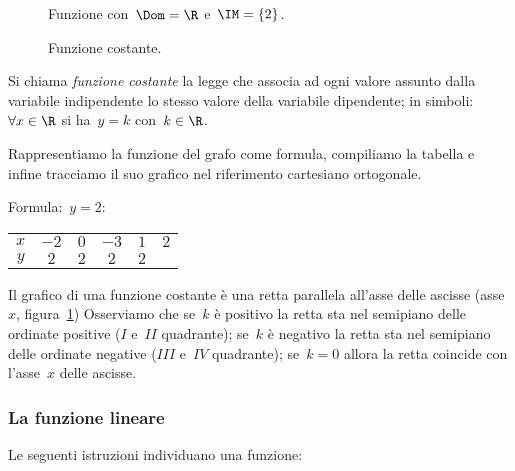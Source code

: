 \begin{inaccessibleblock}
 \begin{figure}[h]%
 \begin{minipage}[b]{.50\textwidth}
  \centering
  \caption{Funzione con~\(\Dom=\R\) e~\(\IM=\{2\}\).}\label{fig:D.24}
 \end{minipage}\hfil
 \begin{minipage}[b]{.4\textwidth}
  \centering
  \caption{Funzione costante.}\label{fig:D.25}
 \end{minipage}
\end{figure}
\end{inaccessibleblock}

\begin{definizione}
Si chiama \emph{funzione costante} la legge che associa ad ogni valore 
assunto 
dalla variabile indipendente lo stesso valore
della variabile dipendente; in simboli:~\(\forall x\in \R\) si ha~\(y=k\) 
con~\(k\in \R\).
\end{definizione}
Rappresentiamo la funzione del grafo come formula, compiliamo la tabella e 
infine tracciamo il suo grafico
nel riferimento cartesiano ortogonale.

Formula:~\(y=2\):
\begin{center}
 \begin{tabular}{cccccc}
 \toprule
 \(x\) & \(-2\) & \(0\) & \(-3\) & \(1\) & \(2\) \\
 \(y\) & \(2\) & \(2\) & \(2\) & \(2\) &  \\
 \bottomrule
 \end{tabular}
\end{center}

Il grafico di una funzione costante è una retta parallela all'asse delle 
ascisse 
(asse~\(x\), figura~\ref{fig:D.25})
Osserviamo che se~\(k\) è positivo la retta sta nel semipiano delle ordinate 
positive (\(I\) e~\(II\) quadrante);
se~\(k\) è negativo la retta sta nel semipiano delle ordinate negative 
(\(III\) 
e~\(IV\) quadrante);
se~\(k=0\) allora la retta coincide con l'asse~\(x\) delle ascisse.


\subsubsection{La funzione lineare}
Le seguenti istruzioni individuano una funzione:
\begin{inaccessibleblock}
\begin{center}
 
\end{center}
\end{inaccessibleblock}

